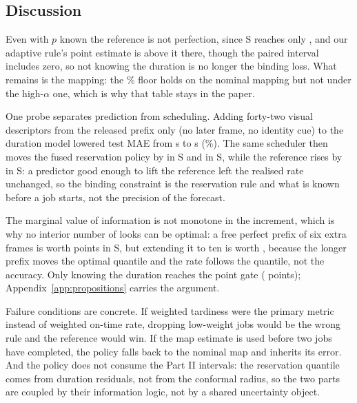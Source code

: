 \documentclass{swmcmthesis}
\begin{document}


\subsection{Discussion}
\label{sec:p3disc}

Even with $p$ known the reference is not perfection, since S\slotCaseThree{} reaches only \slotPStochSThreeOracleETA{}, and our adaptive rule's point estimate is above it
there, though the paired interval includes zero, so not knowing the duration is no
longer the binding loss. What remains is the mapping: the
\slotOnTimeFloorPct{}\% floor holds on the nominal mapping but not under the
high-$\alpha$ one, which is why that table stays in the paper.

One probe separates prediction from scheduling. Adding forty-two visual descriptors
from the released prefix only (no later frame, no identity cue) to the
duration model lowered test MAE from \slotPVisDurBase{} s to \slotPVisDurSel{} s
(\slotPVisDurRel{}\%). The same scheduler then moves the fused reservation policy by
\slotPVisSchedSTwoD{} in S\slotCaseTwo{} and \slotPVisSchedSThreeD{} in S\slotCaseThree{},
while the reference rises by \slotPVisOracleSThreeD{} in S\slotCaseThree{}: a predictor
good enough to lift the reference left the realised rate unchanged, so the binding
constraint is the reservation rule and what is known before a job starts, not the
precision of the forecast.

The marginal value of information is not monotone in the increment, which is why no
interior number of looks can be optimal: a free perfect prefix of six extra frames is worth
\slotPInfoFirstSTwo{} points in S\slotCaseTwo{}, but extending it to ten is worth
\slotPInfoSecondSTwo{}, because the longer prefix moves the optimal quantile and the rate
follows the quantile, not the accuracy. Only knowing the duration reaches the
\slotPInfoGate{} point gate (\slotPInfoTrueMax{} points); Appendix~\ref{app:propositions}
carries the argument.

Failure conditions are concrete. If weighted tardiness were the primary metric
instead of weighted on-time rate, dropping low-weight jobs would be the wrong rule
and the reference would win. If the map estimate is used before two jobs have
completed, the policy falls back to the nominal map and inherits its error. And the
policy does not consume the Part II intervals: the reservation quantile comes from
duration residuals, not from the conformal radius, so the two parts are coupled by
their information logic, not by a shared uncertainty object.
\end{document}
